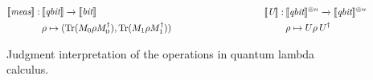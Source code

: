 \begin{figure}[H]
\begin{equation*}
\begin{split}
\begin{aligned}
  &
  \hspace{0pt}
  \begin{minipage}[t]{0.45\textwidth}
  $\begin{aligned}
    [\![\textit{meas}]\!]:\hspace{2pt} & \llbracket \textit{qbit} \rrbracket \xrightarrow{} \llbracket \textit{bit} \rrbracket  \\
    &\rho \mapsto ( \text{Tr} (M_{0} \rho M_{0}^{\dag}), \text{Tr} (M_{1} \rho M_{1}^{\dag})) 
  \end{aligned}$
  \end{minipage} 
  \hspace{118pt}
  \begin{minipage}[t]{0.45\textwidth}
  $\begin{aligned}
    [\![\textit{U} ]\!] : \hspace{2pt} & \llbracket \textit{qbit} \rrbracket^{\otimes n} \xrightarrow{} \llbracket 
    \textit{qbit} \rrbracket^{\otimes n} \\
    & \rho \mapsto U \rho \hspace{2pt}  U^{\dag}
  \end{aligned}$
  \end{minipage} \\
  \end{aligned}
  \end{split}
  \end{equation*}
  \caption{Judgment interpretation of the operations in quantum lambda calculus.}
  \label{fig:interpret_ops}
  \end{figure}

